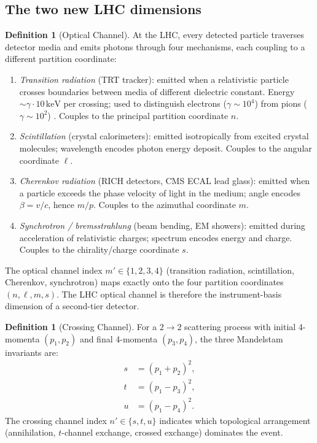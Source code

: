 \documentclass[twocolumn,10pt,a4paper]{article}
\theoremstyle{thmstyle}
\theoremstyle{definition}
\newtheorem{definition}[theorem]{Definition}
\theoremstyle{remark}
\begin{document}
\subsection{The two new LHC dimensions}

\begin{definition}[Optical Channel]
\label{def:optical}
At the LHC, every detected particle traverses detector media and emits
photons through four mechanisms, each coupling to a different partition
coordinate:
\begin{enumerate}[nosep,label=(\roman*)]
\item \emph{Transition radiation} (TRT tracker): emitted when a relativistic
  particle crosses boundaries between media of different dielectric constant.
  Energy $\sim \gamma \cdot 10\,\mathrm{keV}$ per crossing; used to
  distinguish electrons ($\gamma \sim 10^4$) from pions ($\gamma \sim 10^2$)
  \citep{atlas2008}.  Couples to the principal partition coordinate $n$.
\item \emph{Scintillation} (crystal calorimeters): emitted isotropically
  from excited crystal molecules; wavelength encodes photon energy deposit.
  Couples to the angular coordinate $\ell$.
\item \emph{Cherenkov radiation} (RICH detectors, CMS ECAL lead glass):
  emitted when a particle exceeds the phase velocity of light in the medium;
  angle encodes $\beta = v/c$, hence $m/p$.
  Couples to the azimuthal coordinate $m$.
\item \emph{Synchrotron / bremsstrahlung} (beam bending, EM showers):
  emitted during acceleration of relativistic charges; spectrum encodes
  energy and charge.  Couples to the chirality/charge coordinate $s$.
\end{enumerate}
The optical channel index $m' \in \{1,2,3,4\}$ (transition radiation,
scintillation, Cherenkov, synchrotron) maps exactly onto the four partition
coordinates $(n, \ell, m, s)$.  The LHC optical channel is therefore the
instrument-basis dimension of a second-tier detector.
\end{definition}

\begin{definition}[Crossing Channel]
\label{def:crossing}
For a $2\to 2$ scattering process with initial 4-momenta $(p_1, p_2)$
and final 4-momenta $(p_3, p_4)$, the three Mandelstam invariants are:
\begin{align}
s &= (p_1 + p_2)^2, \label{eq:s} \\
t &= (p_1 - p_3)^2, \label{eq:t} \\
u &= (p_1 - p_4)^2. \label{eq:u}
\end{align}
The crossing channel index $n' \in \{s, t, u\}$ indicates which topological
arrangement (annihilation, $t$-channel exchange, crossed exchange) dominates
the event.
\end{definition}
\end{document}
